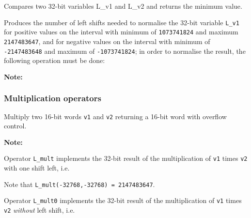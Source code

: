  

Compares two 32-bit variables L\_v1 and L\_v2 and returns the
minimum value.


Produces the number of left shifts needed to normalise the 32-bit
variable {\tt L\_v1} for positive values on the interval with
minimum of {\tt 1073741824} and maximum {\tt 2147483647}, and for
negative values on the interval with minimum of {\tt -2147483648}
and maximum of {\tt -1073741824}; in order to normalise the
result, the following operation must be done:


\textbf{Note:} \hfill {}

\subsubsection{Multiplication operators}


Multiply two 16-bit words {\tt v1} and {\tt v2} returning a 16-bit word with overflow control.

\textbf{Note:} \hfill {}


Operator {\tt L\_mult} implements the 32-bit result of the
multiplication of {\tt v1} times {\tt v2} with one shift left,
i.e.


Note that {\tt L\_mult(-32768,-32768) = 2147483647}.


Operator {\tt L\_mult0} implements the 32-bit result of the
multiplication of {\tt v1} times {\tt v2} {\em without} left
shift, i.e.

